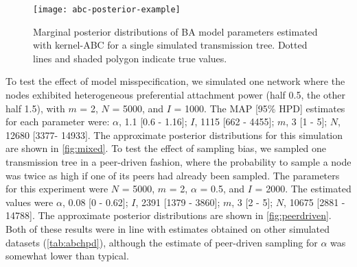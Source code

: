 \begin{figure}[ht]
    \centering
    \texttt{[image: abc-posterior-example]}
  \vspace{6pt}
  \caption{
    Marginal posterior distributions of BA model parameters estimated
    with kernel-ABC for a single simulated transmission tree. Dotted
    lines and shaded polygon indicate true values.
  }
  \label{fig:abcex}
\end{figure}



To test the effect of model misspecification, we simulated one network where
the nodes exhibited heterogeneous preferential attachment power (half 0.5, the
other half 1.5), with $m$ = 2, $N$ = 5000, and $I$ = 1000. The MAP [95\%
HPD] estimates for each parameter were: 
$\alpha$, 
  1.1 
  [0.6 -
   1.16];
$I$,
  1115 
  [662 -
   4455];
$m$,
  3 
  [1 -
   5];
$N$,
  12680 
  [3377-
   14933].
The approximate posterior distributions for this simulation are shown in
\cref{fig:mixed}. To test the effect of sampling bias, we sampled one
transmission tree in a peer-driven fashion, where the probability to sample a
node was twice as high if one of its peers had already been sampled. The
parameters for this experiment were $N$ = 5000, $m$ = 2, $\alpha$ = 0.5, and
$I$ = 2000. The estimated values were
$\alpha$, 
  0.08 
  [0 -
   0.62];
$I$,
  2391 
  [1379 -
   3860];
$m$,
  3 
  [2 -
   5];
$N$,
  10675 
  [2881 -
   14788].
The approximate posterior distributions are shown in \cref{fig:peerdriven}. Both
of these results were in line with estimates obtained on other simulated
datasets (\cref{tab:abchpd}), although the estimate of peer-driven sampling for
$\alpha$ was somewhat lower than typical.

